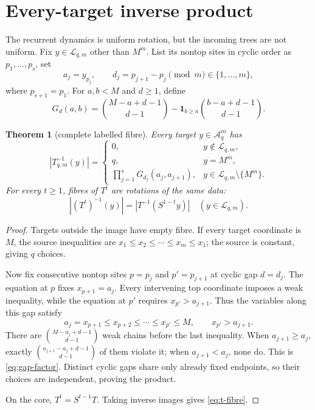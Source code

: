\documentclass[a4paper,10pt]{amsart}
\newtheorem{theorem}{Theorem}[section]
\theoremstyle{remark}
\newcommand{\A}{\mathcal A}
\newcommand{\Lcal}{\mathcal L}
\begin{document}
\section{Every-target inverse product}

The recurrent dynamics is uniform rotation, but the incoming trees are not
uniform.  Fix $y\in\Lcal_{q,m}$ other than $M^m$.  List its nontop sites in
cyclic order as $p_1,\ldots,p_s$, set
\begin{equation*}
 a_j=y_{p_j},\qquad
 d_j=p_{j+1}-p_j\pmod m\in\{1,\ldots,m\},
\end{equation*}
where $p_{s+1}=p_1$.  For $a,b<M$ and $d\ge1$, define
\begin{equation}\label{eq:gap-factor}
 G_d(a,b)=\binom{M-a+d-1}{d-1}
 -\mathbf1_{b\ge a}\binom{b-a+d-1}{d-1}.
\end{equation}

\begin{theorem}[complete labelled fibre]\label{thm:fibre}
Every target $y\in\A_q^m$ has
\begin{equation}\label{eq:fibre}
 |T_{q,m}^{-1}(y)|=
 \begin{cases}
 0,&y\notin\Lcal_{q,m},\\
 q,&y=M^m,\\
 \displaystyle\prod_{j=1}^sG_{d_j}(a_j,a_{j+1}),
   &y\in\Lcal_{q,m}\setminus\{M^m\}.
 \end{cases}
\end{equation}
For every $t\ge1$, fibres of $T^t$ are rotations of the same data:
\begin{equation}\label{eq:t-fibre}
 |(T^t)^{-1}(y)|=|T^{-1}(S^{1-t}y)|
 \quad(y\in\Lcal_{q,m}).
\end{equation}
\end{theorem}

\begin{proof}
Targets outside the image have empty fibre.  If every target coordinate is
$M$, the source inequalities are
$x_1\le x_2\le\cdots\le x_m\le x_1$; the source is constant, giving $q$
choices.

Now fix consecutive nontop sites $p=p_j$ and $p'=p_{j+1}$ at cyclic gap
$d=d_j$.  The equation at $p$ fixes $x_{p+1}=a_j$.  Every intervening top
coordinate imposes a weak inequality, while the equation at $p'$ requires
$x_{p'}>a_{j+1}$.  Thus the variables along this gap satisfy
\begin{equation*}
 a_j=x_{p+1}\le x_{p+2}\le\cdots\le x_{p'}\le M,
 \qquad x_{p'}>a_{j+1}.
\end{equation*}
There are $\binom{M-a_j+d-1}{d-1}$ weak chains before the last inequality.
When $a_{j+1}\ge a_j$, exactly
$\binom{a_{j+1}-a_j+d-1}{d-1}$ of them violate it; when
$a_{j+1}<a_j$, none do.  This is \eqref{eq:gap-factor}.  Distinct cyclic
gaps share only already fixed endpoints, so their choices are independent,
proving the product.

On the core, $T^t=S^{t-1}T$.  Taking inverse images gives
\eqref{eq:t-fibre}.
\end{proof}
\end{document}

